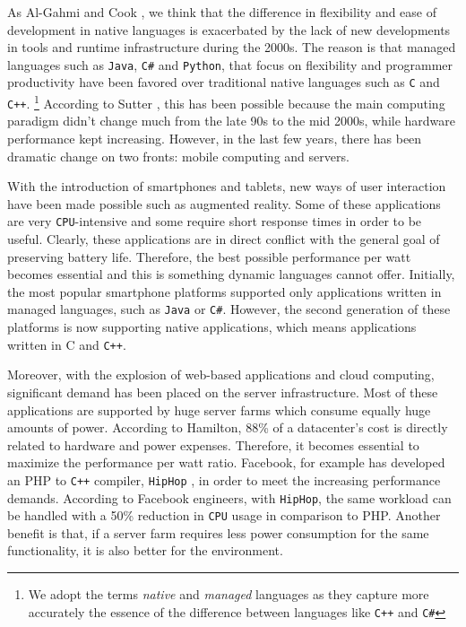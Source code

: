 As Al-Gahmi and Cook \cite{Al-Gahmi}, we think that the difference in flexibility and ease of development in native languages is
exacerbated by the lack of new developments in tools and runtime infrastructure during the 2000s. The reason is that managed
languages such as \texttt{Java}, \texttt{C\#} and \texttt{Python}, that focus on flexibility and programmer productivity
have been favored over traditional native languages such as \texttt{C} and \texttt{C++}. \footnote{We adopt the terms \emph{native}
and \emph{managed} languages as they capture more accurately the essence of the difference between languages like \texttt{C++} and
\texttt{C\#}} According to Sutter \cite{CPPAndBeyond2011}, this has been possible because the main computing paradigm didn't change
much from the late 90s to the mid 2000s, while hardware performance kept increasing. However, in the last few years, there has been dramatic
change on two fronts: mobile computing and servers.

With the introduction of smartphones and tablets, new ways of user interaction have been made possible such as augmented reality. Some of
these applications are very \texttt{CPU}-intensive and some require short response times in order to be useful. Clearly, these applications are in
direct conflict with the general goal of preserving battery life. Therefore, the best possible performance per watt becomes essential
and this is something dynamic languages cannot offer. Initially, the most popular smartphone platforms supported only applications
written in managed languages, such as \texttt{Java} or \texttt{C\#}. However, the second generation of these platforms is now supporting native applications,
which means applications written in C and \texttt{C++}.

Moreover, with the explosion of web-based applications and cloud computing, significant demand has been placed on the server infrastructure.
Most of these applications are supported by huge server farms which consume equally huge amounts of power. According to Hamilton, \cite{Hamilton}
88\% of a datacenter's cost is directly related to hardware and power expenses. Therefore, it becomes essential to maximize the performance per watt ratio.
Facebook, for example has developed an PHP to \texttt{C++} compiler, \texttt{HipHop} \cite{HipHop}, in order to meet the increasing performance demands.
According to Facebook engineers, with \texttt{HipHop}, the same workload can be handled with a 50\% reduction in \texttt{CPU} usage in comparison to PHP.
Another benefit is that, if a server farm requires less power consumption for the same functionality, it is also better for the environment.

